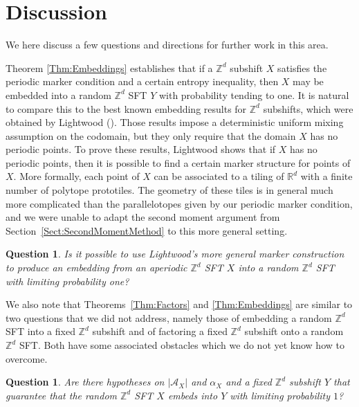 \documentclass[12pt]{amsart}
\newtheorem{question}[theorem]{Question}
\theoremstyle{definition}
\begin{document}
\section{Discussion}

We here discuss a few questions and directions for further work in this area.

Theorem \ref{Thm:Embeddings} establishes that if a $\mathbb{Z}^d$ subshift $X$ satisfies the periodic marker condition and a certain entropy inequality, then $X$ may be embedded into a random $\mathbb{Z}^d$ SFT $Y$ with probability tending to one. It is natural to compare this to the best known embedding results for $\mathbb{Z}^d$ subshifts, which were obtained by Lightwood (\cite{Lightwood2003,Lightwood2004}). Those results impose a deterministic uniform mixing assumption on the codomain, but they only require that the domain 
$X$ has no periodic points. To prove these results, Lightwood shows that if $X$ has no periodic points, then it is possible to find a certain marker structure for points of $X$. More formally, each point of $X$ can be associated to a tiling of $\mathbb{R}^d$ with a finite number of polytope prototiles. The geometry of these tiles is in general much more complicated than the parallelotopes given by our periodic marker condition, and we were unable to adapt the second moment argument from Section~\ref{Sect:SecondMomentMethod} to this more general setting. %

\begin{question}
Is it possible to use Lightwood's more general marker construction to produce an embedding from an aperiodic $\mathbb{Z}^d$ SFT $X$ into a random $\mathbb{Z}^d$ SFT with limiting probability one? 
\end{question}

We also note that Theorems~\ref{Thm:Factors} and \ref{Thm:Embeddings} are similar to two questions that we did not address, namely those of embedding a random $\mathbb{Z}^d$ SFT into a fixed $\mathbb{Z}^d$ subshift and of factoring a fixed $\mathbb{Z}^d$ subshift onto a random $\mathbb{Z}^d$ SFT. Both have some associated obstacles which we do not yet know how to overcome. 

\begin{question}\label{badq1}
Are there hypotheses on $|\mathcal{A}_X|$ and $\alpha_X$ and a fixed $\mathbb{Z}^d$ subshift $Y$ that guarantee that the random $\mathbb{Z}^d$ SFT $X$ embeds into $Y$ with limiting probability $1$?
\end{question}
\end{document}
